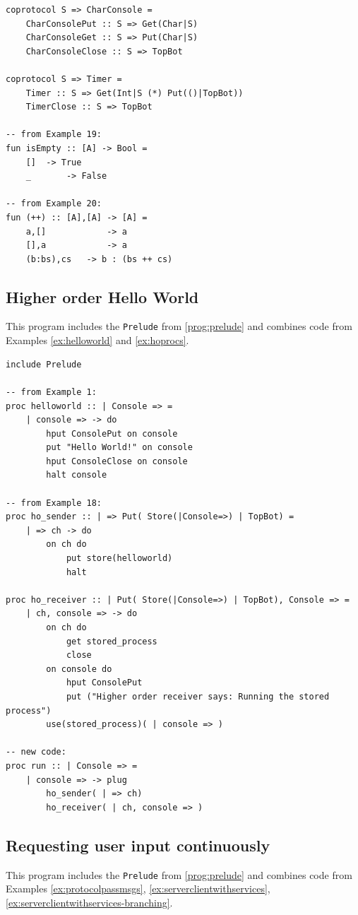 \documentclass[acmsmall]{acmart}
\begin{document}
\begin{appendix}
\begin{lstlisting}
coprotocol S => CharConsole =
    CharConsolePut :: S => Get(Char|S) 
    CharConsoleGet :: S => Put(Char|S) 
    CharConsoleClose :: S => TopBot 

coprotocol S => Timer =
    Timer :: S => Get(Int|S (*) Put(()|TopBot))
    TimerClose :: S => TopBot

-- from Example 19:
fun isEmpty :: [A] -> Bool =
	[]	-> True
	_		-> False
	
-- from Example 20:
fun (++) :: [A],[A] -> [A] =
	a,[]			-> a
	[],a 			-> a
	(b:bs),cs	-> b : (bs ++ cs)  
\end{lstlisting}

\subsection{Higher order Hello World}
\label{prog:h.o.hello_world}

This program includes the \lstinline{Prelude} from \ref{prog:prelude} and combines code from Examples \ref{ex:helloworld} and \ref{ex:hoprocs}.

\begin{lstlisting}
include Prelude

-- from Example 1:
proc helloworld :: | Console => =
	| console => -> do
		hput ConsolePut on console
		put "Hello World!" on console
		hput ConsoleClose on console
		halt console

-- from Example 18:
proc ho_sender :: | => Put( Store(|Console=>) | TopBot) = 
	| => ch -> do
		on ch do
			put store(helloworld)	
			halt
			
proc ho_receiver :: | Put( Store(|Console=>) | TopBot), Console => =
	| ch, console => -> do
		on ch do
			get stored_process
			close
		on console do
			hput ConsolePut
			put ("Higher order receiver says: Running the stored process")
		use(stored_process)( | console => )

-- new code:
proc run :: | Console => = 
	| console => -> plug
		ho_sender( | => ch)
		ho_receiver( | ch, console => )
\end{lstlisting}


\subsection{Requesting user input continuously}
\label{prog:user_input_client_server}

This program includes the \lstinline{Prelude} from \ref{prog:prelude} and combines code from Examples \ref{ex:protocolpassmsgs}, \ref{ex:serverclientwithservices}, \ref{ex:serverclientwithservices-branching}.


\end{appendix}
\end{document}

